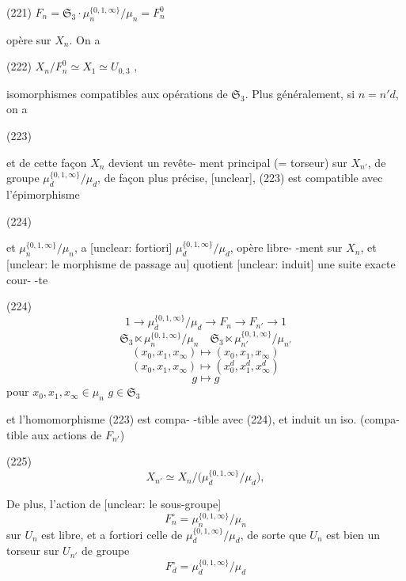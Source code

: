 (221) $F_n = \mathfrak{S}_3 \cdot \mu_n^{\{0,1,\infty\}} / \mu_n = F_n^0$

opère sur $X_n$.
On a

(222) $X_n / F_n^0 \simeq X_1 \simeq U_{0,3}$ ,

isomorphismes compatibles aux opérations de
$\mathfrak{S}_3$. Plus généralement, si
$n = n'd$, on a

(223)

et de cette façon $X_n$ devient un revête-
ment principal (= torseur) sur $X_{n'}$, de
groupe $\mu_d^{\{0,1,\infty\}} / \mu_d$, de façon plus précise,
[unclear], (223) est compatible avec
l'épimorphisme

(224)

\newpage


et $\mu_n^{\{0,1,\infty\}}/\mu_n$, a [unclear: fortiori] $\mu_d^{\{0,1,\infty\}}/\mu_d$, opère libre-
-ment sur $X_n$, et [unclear: le morphisme de passage au]
quotient [unclear: induit] une suite exacte cour-
-te

(224)
$$1 \longrightarrow \mu_d^{\{0,1,\infty\}} / \mu_d \longrightarrow F_n \longrightarrow F_{n'} \longrightarrow 1$$
$$ \mathfrak{S}_3 \ltimes \mu_n^{\{0,1,\infty\}}/\mu_n \quad \mathfrak{S}_3 \ltimes \mu_{n'}^{\{0,1,\infty\}}/\mu_{n'} $$
$$ (x_0, x_1, x_\infty) \longmapsto (x_0, x_1, x_\infty) $$
$$ (x_0, x_1, x_\infty) \longmapsto (x_0^d, x_1^d, x_\infty^d) $$
$$ g \longmapsto g $$
pour $x_0, x_1, x_\infty \in \mu_n$
$g \in \mathfrak{S}_3$

et l'homomorphisme (223) est compa-
-tible avec (224), et induit un iso. (compa-
tible aux actions de $F_{n'}$)

(225) $$ X_{n'} \simeq X_n \Big/ \Big( \mu_d^{\{0,1,\infty\}}/\mu_d \Big) , $$

De plus, l'action de [unclear: le sous-groupe]
$$ F_n^\circ = \mu_n^{\{0,1,\infty\}}/\mu_n $$
sur $U_n$ est libre, et a fortiori celle
de $\mu_d^{\{0,1,\infty\}}/\mu_d$, de sorte que $U_n$ est
bien un torseur sur $U_{n'}$ de groupe
$$ F_d^\circ = \mu_d^{\{0,1,\infty\}}/\mu_d $$

